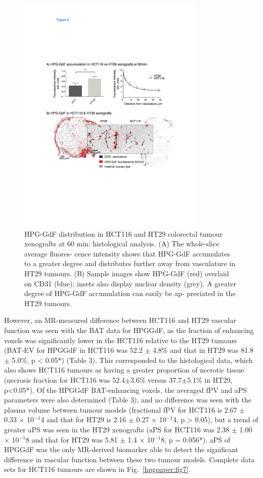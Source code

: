 \begin{figure}[htbp]   
 \begin{center}  
 \includegraphics[width=0.8\textwidth]{hpg/hpg-images/hpg_fig6-accumulation.pdf}
 \caption{HPG-GdF distribution in HCT116 and HT29 colorectal tumour xenografts at 60 min: histological analysis. (A) The whole-slice average fluores- cence intensity shows that HPG-GdF accumulates to a greater degree and distributes further away from vasculature in HT29 tumours. (B) Sample images show HPG-GdF (red) overlaid on CD31 (blue); insets also display nuclear density (grey). A greater degree of HPG-GdF accumulation can easily be ap- preciated in the HT29 tumours.}  
 \label{hpgpaper:fig6}  
 \end{center}
\end{figure}

However, an MR-measured difference between HCT116 and HT29 vascular function was seen with the BAT data for HPGGdF, as the fraction of enhancing voxels was significantly lower in the HCT116 relative to the HT29 tumours (BAT-EV for HPGGdF in HCT116 was 52.2 $\pm$ 4.8\% and that in HT29 was 81.8 $\pm$ 5.0\%, p < 0.05*) (Table 3).
This corresponded to the histological data, which also shows HCT116 tumours as having a greater proportion of necrotic tissue (necrosis fraction for HCT116 was 52.4$\pm$3.6\% versus 37.7$\pm$5.1\% in HT29, p<0.05*).
Of the HPGGdF BAT-enhancing voxels, the averaged fPV and aPS parameters were also determined (Table 3), and no difference was seen with the plasma volume between tumour models (fractional fPV for HCT116 is 2.67 $\pm$ 0.33 × 10$^{-1}$4 and that for HT29 is 2.16 $\pm$ 0.27 × 10$^{-1}$4, p > 0.05), but a trend of greater aPS was seen in the HT29 xenografts (aPS for HCT116 was 2.38 $\pm$ 1.00 × 10$^{-1}$8 and that for HT29 was 5.81 $\pm$ 1.4 × 10$^{-1}$8, p = 0.056*).
aPS of HPGGdF was the only MR-derived biomarker able to detect the significant difference in vascular function between these two tumour models.
Complete data sets for HCT116 tumours are shown in Fig.~\ref{hpgpaper:fig7}.


